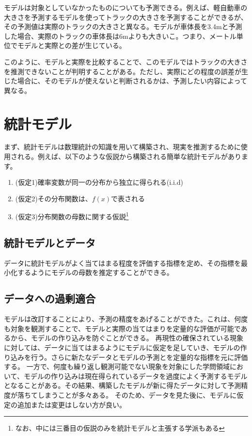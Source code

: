 モデルは対象としていなかったものについても予測できる。例えば、軽自動車の大きさを予測するモデルを使ってトラックの大きさを予測することができるが、その予測値は実際のトラックの大きさと異なる。モデルが車体長を3.4mと予測した場合、実際のトラックの車体長は6mよりも大きいこ。つまり、メートル単位でモデルと実際との差が生じている。

このように、モデルと実際を比較することで、このモデルではトラックの大きさを推測できないことが判明することがある。ただし、実際にどの程度の誤差が生じた場合に、そのモデルが使えないと判断されるかは、予測したい内容によって異なる。


\section{統計モデル}
まず、統計モデルは数理統計の知識を用いて構築され、現実を推測するために使用される。例えば、以下のような仮説から構築される簡単な統計モデルがあります。

\begin{enumerate}
 \item (仮定1)確率変数が同一の分布から独立に得られる(i.i.d)
 \item (仮定2)その分布関数は、$f(x)$で表される
 \item (仮定3)分布関数の母数に関する仮説\footnote{なお、中には三番目の仮説のみを統計モデルと主張する学派もある\cite{塩見_正衛2021}}
\end{enumerate}

\subsection{統計モデルとデータ}
データに統計モデルがよく当てはまる程度を評価する指標を定め、その指標を最小化するようにモデルの母数を推定することができる。



\subsection{データへの過剰適合}
モデルは改訂することにより、予測の精度をあげることができた。これは、何度も対象を観測することで、モデルと実際の当てはまりを定量的な評価が可能であるから、モデルの作り込みを防ぐことができる。
再現性の確保されている現象に対しては、データに当てはまるようにモデルに仮定を足していき、モデルの作り込みを行う。さらに新たなデータとモデルの予測とを定量的な指標を元に評価する。
一方で、何度も繰り返し観測可能でない現象を対象にした学問領域において、モデルの作り込みは現在得られているデータを過度によく予測するモデルとなることがある。その結果、構築したモデルが新に得たデータに対して予測精度が落ちてしまうことが多々ある。
そのため、データを見た後に、モデルに仮定の追加または変更はしない方が良い。




